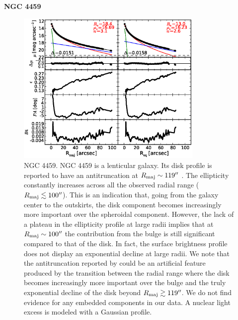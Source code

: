 \documentclass[preprint2]{emulateapj}
\newcommand{\fitfigurewidth}{0.8\textwidth}
\begin{document}
  \clearpage\newpage\noindent
  {\bf NGC 4459 \\}

  \begin{figure}[h]
  \begin{center}
  \includegraphics[width=\fitfigurewidth]{images/n4459_1Dfit.eps}
  \caption{NGC 4459.
  NGC 4459 is a lenticular galaxy.
  Its disk profile is reported to have an antitruncation at $R_{\rm maj} \sim 119''$ \citep{gutierrez2011}.
  The ellipticity constantly increases across all the observed radial range ($R_{\rm maj} \lesssim 100''$).
  This is an indication that, going from the galaxy center to the outskirts,
  the disk component becomes increasingly more important over the spheroidal component.
  However, the lack of a plateau in the ellipticity profile at large radii implies that at $R_{\rm maj} \sim 100''$ 
  the contribution from the bulge is still significant compared to that of the disk.
  In fact, the surface brightness profile does not display an exponential decline at large radii.
  We note that the antitruncation reported by \cite{gutierrez2011} could be an artificial feature 
  produced by the transition between the radial range where the disk becomes increasingly more important 
  over the bulge and the truly exponential decline of the disk beyond $R_{\rm maj} \gtrsim 119''$.
  We do not find evidence for any embedded components in our data.
  A nuclear light excess is modeled with a Gaussian profile.
  }
  \end{center}
  \end{figure}
\end{document}
